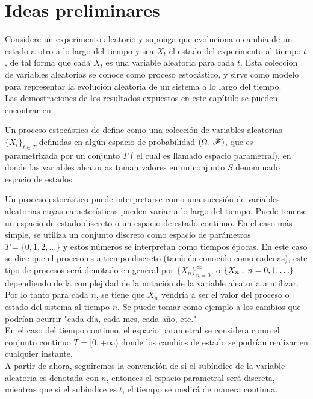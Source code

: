 \section{Ideas preliminares}
Considere un experimento aleatorio y suponga que evoluciona o cambia de un estado a otro a lo largo del tiempo y sea $X_t$ el estado del experimento al tiempo $t$, de tal forma que cada $X_t$ es una variable aleatoria para cada $t$. Esta colección de variables aleatorias se conoce como proceso estocástico, y sirve como modelo para representar la evolución aleatoria de un sistema a lo largo del tiempo.\\
Las demostraciones de los resultados expuestos en este capítulo se pueden encontrar en \cite{Feller}, \cite{Rincon3} \\
\begin{Def}
    Un proceso estocástico de define como una colección de variables aleatorias $\{X_t\}_{t\in T}$ definidas en algún espacio de probabilidad $(\Omega,\thinspace\mathscr{F})$, que es parametrizada por un conjunto $T$ ( el cual es llamado espacio parametral), en donde las variables aleatorias toman valores en un conjunto $S$ denominado espacio de estados.
\end{Def}
Un proceso estocástico puede interpretarse como una sucesión de variables aleatorias cuyas características pueden variar a lo largo del tiempo.
Puede tenerse un espacio de estado discreto o un espacio de estado continuo. En el caso más simple, se utiliza un conjunto discreto como espacio de parámetros $T= \{0, 1, 2,\ldots\}$ y estos números se interpretan como tiempos épocas. En este caso se dice que el proceso es a tiempo discreto (también conocido como cadenas), este tipo
de procesos será denotado en general por $\{X_n\}^{\infty}_{n=0}$, o $\{X_n:\thinspace n= 0, 1, \ldots\}$ dependiendo de la complejidad de la notación de la variable aleatoria a utilizar.\\Por lo tanto para cada $n$, se tiene que $X_n$ vendría a ser el valor del proceso o estado del sistema al tiempo $n$.
Se puede tomar como ejemplo a los cambios que podrían ocurrir "cada día, cada mes, cada año, etc."\\ En el caso del tiempo continuo, el espacio parametral se considera como el conjunto continuo $T=[0,+\infty)$ donde los cambios de estado se podrían realizar en cualquier instante.\\
A partir de ahora, seguiremos la convención de si el subíndice de la variable aleatoria es denotada con $n$, entonces el espacio parametral será discreta, mientras que si el subíndice es $t$, el tiempo se medirá de manera continua.\\
